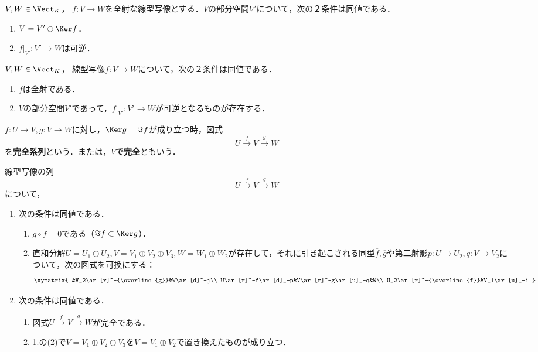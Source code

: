 \documentclass[uplatex, dvipdfmx]{jsreport}
\begin{document}
\begin{proposition}[核の補空間の特徴付け]\label{prop-pre-homomorphism-thm}
    $V,W\in\Vect_K$，
    $f:V\to W$を全射な線型写像とする．$V$の部分空間$V'$について，次の２条件は同値である．
    \begin{enumerate}
        \item $V=V'\oplus\Ker f$．
        \item $f|_{V'}:V'\to W$は可逆．
    \end{enumerate}
\end{proposition}

\begin{corollary}[全射の特徴付け]
    $V,W\in\Vect_K$，
    線型写像$f:V\to W$について，次の２条件は同値である．
    \begin{enumerate}
        \item $f$は全射である．
        \item $V$の部分空間$V'$であって，$f|_{V'}:V'\to W$が可逆となるものが存在する．
    \end{enumerate}
\end{corollary}

\begin{definition}
    $f:U\to V,g:V\to W$に対し，$\Ker g=\Im f$が成り立つ時，図式
    \[ U\xrightarrow{f}V\xrightarrow{g}W \]
    を\textbf{完全系列}という．または，\textbf{$V$で完全}ともいう．
\end{definition}

\begin{proposition}[図式が完全であることの部分空間と直和の言葉による特徴付け]
    線型写像の列
    \[ U\xrightarrow{f}V\xrightarrow{g}W \]
    について，
    \begin{enumerate}
        \item 次の条件は同値である．
        \begin{enumerate}[(1)]
            \item $g\circ f=0$である（$\Im f\subset\Ker g$）．
            \item 直和分解$U=U_1\oplus U_2,V=V_1\oplus V_2\oplus V_3, W=W_1\oplus W_2$が存在して，それに引き起こされる同型$\overline{f},\overline{g}$や第二射影$p:U\to U_2,q:V\to V_2$について，次の図式を可換にする：
            \[\xymatrix{
                &V_2\ar[r]^-{\overline{g}}&W\ar[d]^-j\\
                U\ar[r]^-f\ar[d]_-p&V\ar[r]^-g\ar[u]_-q&W\\
                U_2\ar[r]^-{\overline{f}}&V_1\ar[u]_-i
            }\]
        \end{enumerate}
        \item 次の条件は同値である．
        \begin{enumerate}[(1)]
            \item 図式$U\xrightarrow{f}V\xrightarrow{g}W$が完全である．
            \item 1.の(2)で$V=V_1\oplus V_2\oplus V_3$を$V=V_1\oplus V_2$で置き換えたものが成り立つ．
        \end{enumerate}
    \end{enumerate}
\end{proposition}
\end{document}
